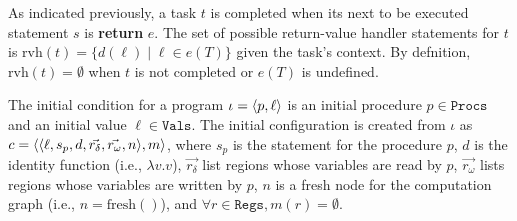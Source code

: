 As indicated previously, a task $t$ is completed when its next to be executed statement $s$ is \textbf{return} $e$. The set of possible return-value handler statements for $t$ is $\mathrm{rvh}(t) = \{d(\ell) \mid \ell \in e(T)\}$ given the task's context. By defnition, $\mathrm{rvh}(t) = \emptyset$ when $t$ is not completed or $e(T)$ is undefined. 

The initial condition for a program $\iota = \langle p, \ell \rangle $ is an initial procedure $p \in \texttt{Procs}$ and an initial value $\ell \in \texttt{Vals}$. The initial configuration is created from $\iota$ as $c = \langle \langle \ell, s_p, d, \vec{r_\delta}, \vec{r_\omega}, n \rangle , m \rangle $, where $s_p$ is the statement for the procedure $p$, $d$ is the identity function (i.e., $\lambda v.v$), $\vec{r_\delta}$ list regions whose variables are read by $p$, $\vec{r_\omega}$ lists regions whose variables are written by $p$, $n$ is a fresh node for the computation graph (i.e., $n = \mathrm{fresh}()$), and $\forall r \in \texttt{Regs}, m(r) = \emptyset$.

